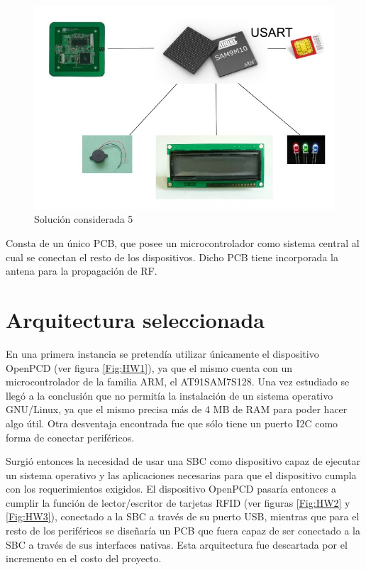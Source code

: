 \begin{itemize}
\begin{figure}[H]
\centering
  \begin{center}
  \includegraphics[scale=.25]{Imagenes/4.jpg} 
  \end{center}
  \caption{Solución considerada 5}\label{Fig:HW5} 
\end{figure}

Consta de un único PCB, que posee un microcontrolador como sistema central al cual se
conectan el resto de los dispositivos. Dicho PCB tiene incorporada la antena para la
propagación de RF.

\end{itemize}

\section{Arquitectura seleccionada}
En una primera instancia se pretendía utilizar únicamente el dispositivo OpenPCD (ver figura \ref{Fig:HW1}), ya que el mismo cuenta con un microcontrolador de la familia ARM, el AT91SAM7S128. Una vez estudiado se llegó a la conclusión que no permitía la instalación de un sistema operativo GNU/Linux, ya que el mismo precisa más de 4 MB de RAM para poder hacer algo útil. Otra desventaja encontrada fue que sólo tiene un puerto I2C como forma de conectar periféricos.

Surgió entonces la necesidad de usar una SBC como dispositivo capaz de ejecutar un sistema operativo y las aplicaciones necesarias para que el dispositivo cumpla con los requerimientos exigidos. El dispositivo OpenPCD pasaría entonces a cumplir la función de lector/escritor de tarjetas RFID (ver figuras \ref{Fig:HW2} y \ref{Fig:HW3}), conectado a la SBC a través de su puerto USB, mientras que para el resto de los periféricos se diseñaría un PCB que fuera capaz de ser conectado a la SBC a través de sus interfaces nativas. Esta arquitectura fue descartada por el incremento en el costo del proyecto.

